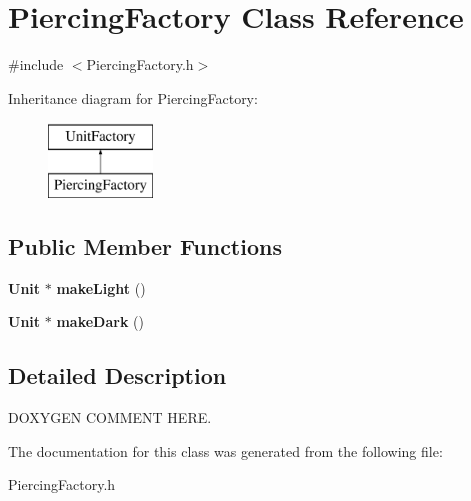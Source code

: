 \section{Piercing\+Factory Class Reference}
\label{class_piercing_factory}


{\ttfamily \#include $<$Piercing\+Factory.\+h$>$}

Inheritance diagram for Piercing\+Factory\+:\begin{figure}[H]
\begin{center}
\leavevmode
\includegraphics[height=2.000000cm]{class_piercing_factory}
\end{center}
\end{figure}
\subsection*{Public Member Functions}
\begin{DoxyCompactItemize}
\item 
{\bf Unit} $\ast$ {\bfseries make\+Light} ()\label{class_piercing_factory_a7d8f0643578e6985d676ab65242b9c2c}

\item 
{\bf Unit} $\ast$ {\bfseries make\+Dark} ()\label{class_piercing_factory_af55c951c6044905d060c0e698d0faafc}

\end{DoxyCompactItemize}


\subsection{Detailed Description}
D\+O\+X\+Y\+G\+E\+N C\+O\+M\+M\+E\+N\+T H\+E\+R\+E. 

The documentation for this class was generated from the following file\+:\begin{DoxyCompactItemize}
\item 
Piercing\+Factory.\+h\end{DoxyCompactItemize}
